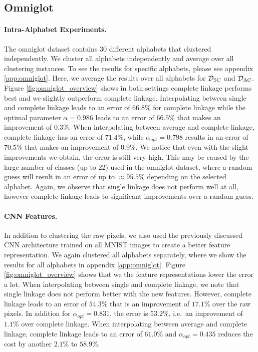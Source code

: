 \subsection{Omniglot}

\paragraph{Intra-Alphabet Experiments.} The omniglot dataset contains 30 different alphabets that clustered independently. We cluster all alphabets independently and average over all clustering instances. To see the results for specific alphabets, please see appendix \ref{app:omniglot}. Here, we average the results over all alphabets for $\mathcal{D}_\text{SC}$ and $\mathcal{D}_\text{AC}$. Figure \ref{fig:omniglot_overview} shows in both settings complete linkage performs best and we slightly outperform complete linkage. Interpolating between single and complete linkage leads to an error of $66.8\%$ for complete linkage while the optimal parameter $\alpha = 0.986$ leads to an error of $66.5\%$ that makes an improvement of $0.3\%$. When interpolating between average and complete linkage, complete linkage has an error of $71.4\%$, while $\alpha_{opt} = 0.798$ results in an error of $70.5\%$ that makes an improvement of $0.9\%$. We notice that even with the slight improvements we obtain, the error is still very high. This may be caused by the large number of classes (up to 22) used in the omniglot dataset, where a random  guess will result in an error of up to $\approx 95.5\%$ depending on the selected alphabet. Again, we observe that single linkage does not perform well at all, however complete linkage leads to significant improvements over a random guess.

\paragraph{CNN Features.} In addition to clustering the raw pixels, we also used the previously discussed CNN architecture trained on all MNIST images to create a better feature representation. We again clustered all alphabets separately, where we show the results for all alphabets in appendix \ref{app:omniglot}. Figure \ref{fig:omniglot_overview} shows that we the feature representations lower the error a lot. When interpolating between single and complete linkage, we note that single linkage does not perform better with the new features. However, complete linkage leads to an error of $54.3\%$ that is an improvement of $17.1\%$ over the raw pixels. In addition for $\alpha_{opt} = 0.831$, the error is $53.2\%$, i.e.\ an improvement of $1.1\%$ over complete linkage. When interpolating between average and complete linkage, complete linkage leads to an error of $61.0\%$ and $\alpha_{opt} = 0.435$ reduces the cost by another $2.1\%$ to $58.9\%$.

